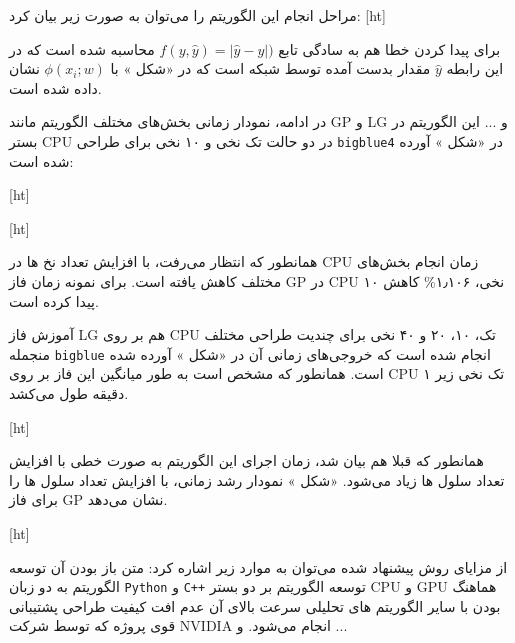 مراحل انجام این الگوریتم را می‌توان به صورت زیر بیان کرد:
[ht]


برای پیدا کردن خطا هم به سادگی تابع $f(y,\hat{y})=|\hat{y}-y|)$ محاسبه شده است که در این رابطه $\hat{y}$ مقدار بدست آمده توسط شبکه است که در «شکل » با $\phi(x_i;w)$ نشان داده شده است.

در ادامه، نمودار زمانی بخش‌های مختلف الگوریتم مانند GP و LG و ... این الگوریتم در بستر CPU در دو حالت تک نخی و ۱۰ نخی برای طراحی \texttt{bigblue4} در «شکل » آورده شده است:

[ht]




[ht]



همانطور که انتظار می‌رفت، با افزایش تعداد نخ ها در CPU زمان انجام بخش‌های مختلف کاهش یافته است. برای نمونه زمان فاز GP در CPU ۱۰ نخی، ۱٫۱۰۶\% کاهش پیدا کرده است.



آموزش فاز LG هم بر روی CPU تک، ۱۰، ۲۰ و ۴۰ نخی برای چندیت طراحی مختلف منجمله \texttt{bigblue} انجام شده است که خروجی‌های زمانی آن در «شکل » آورده شده است. همانطور که مشخص است به طور میانگین این فاز بر روی CPU تک نخی زیر ۱ دقیقه طول می‌کشد.


[ht]

همانطور که قبلا هم بیان شد، زمان اجرای این الگوریتم به صورت خطی با افزایش تعداد سلول ها زیاد می‌شود. «شکل » نمودار رشد زمانی، با افزایش تعداد سلول ها را برای فاز GP نشان می‌دهد.

[ht]



از مزایای روش پیشنهاد شده می‌توان به موارد زیر اشاره کرد:
 متن باز بودن آن
 توسعه الگوریتم به دو زبان \texttt{Python} و \texttt{C++} 
 توسعه الگوریتم بر دو بستر CPU و GPU
 هماهنگ بودن با سایر الگوریتم های تحلیلی
 سرعت بالای آن
 عدم افت کیفیت طراحی
 پشتیبانی قوی پروژه که توسط شرکت NVIDIA انجام می‌شود.
 و ...

